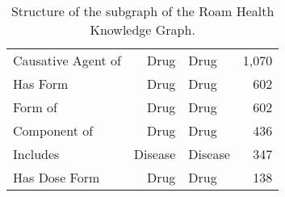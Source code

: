 \documentclass[11pt, a4paper]{article}
\begin{document}
\begin{table}[htb]
\begin{tabular}{l r@{ \ $\rightarrow$ \ }l r}
        Causative Agent of    & Drug    & Drug    & 1,070  \\
        Has Form              & Drug    & Drug    & 602    \\
        Form of               & Drug    & Drug    & 602    \\
        Component of          & Drug    & Drug    & 436    \\
        Includes              & Disease & Disease & 347    \\
        Has Dose Form         & Drug    & Drug    & 138  \\
        \bottomrule
    \end{tabular}
    \caption{Structure of the subgraph of the Roam Health Knowledge Graph.}
    \label{tab:rhkg_structure}
\end{table}
\end{document}
